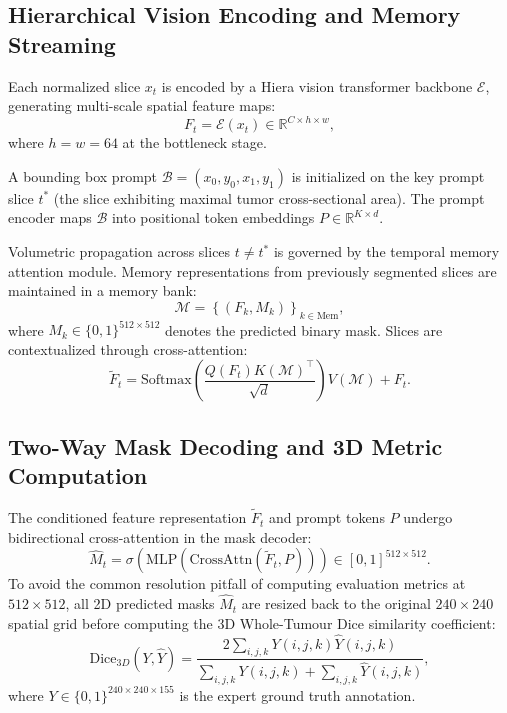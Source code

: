 \documentclass[journal,10pt,twocolumn]{IEEEtran}
\begin{document}
\subsection{Hierarchical Vision Encoding and Memory Streaming}
Each normalized slice $x_t$ is encoded by a Hiera vision transformer backbone $\mathcal{E}$, generating multi-scale spatial feature maps:
\begin{equation}
    F_t = \mathcal{E}(x_t) \in \mathbb{R}^{C \times h \times w},
\end{equation}
where $h = w = 64$ at the bottleneck stage.

A bounding box prompt $\mathcal{B} = (x_0, y_0, x_1, y_1)$ is initialized on the key prompt slice $t^*$ (the slice exhibiting maximal tumor cross-sectional area). The prompt encoder maps $\mathcal{B}$ into positional token embeddings $P \in \mathbb{R}^{K \times d}$.

Volumetric propagation across slices $t \neq t^*$ is governed by the temporal memory attention module. Memory representations from previously segmented slices are maintained in a memory bank:
\begin{equation}
    \mathcal{M} = \left\{ (F_k, M_k) \right\}_{k \in \text{Mem}},
\end{equation}
where $M_k \in \{0, 1\}^{512 \times 512}$ denotes the predicted binary mask. Slices are contextualized through cross-attention:
\begin{equation}
    \tilde{F}_t = \text{Softmax}\left( \frac{Q(F_t) K(\mathcal{M})^\top}{\sqrt{d}} \right) V(\mathcal{M}) + F_t.
\end{equation}

\subsection{Two-Way Mask Decoding and 3D Metric Computation}
The conditioned feature representation $\tilde{F}_t$ and prompt tokens $P$ undergo bidirectional cross-attention in the mask decoder:
\begin{equation}
    \hat{M}_t = \sigma\left( \text{MLP}\left( \text{CrossAttn}(\tilde{F}_t, P) \right) \right) \in [0, 1]^{512 \times 512}.
\end{equation}
To avoid the common resolution pitfall of computing evaluation metrics at $512 \times 512$, all 2D predicted masks $\hat{M}_t$ are resized back to the original $240 \times 240$ spatial grid before computing the 3D Whole-Tumour Dice similarity coefficient:
\begin{equation}
    \text{Dice}_{3D}(Y, \hat{Y}) = \frac{2 \sum_{i,j,k} Y(i,j,k) \hat{Y}(i,j,k)}{\sum_{i,j,k} Y(i,j,k) + \sum_{i,j,k} \hat{Y}(i,j,k)},
\end{equation}
where $Y \in \{0, 1\}^{240 \times 240 \times 155}$ is the expert ground truth annotation.
\end{document}
